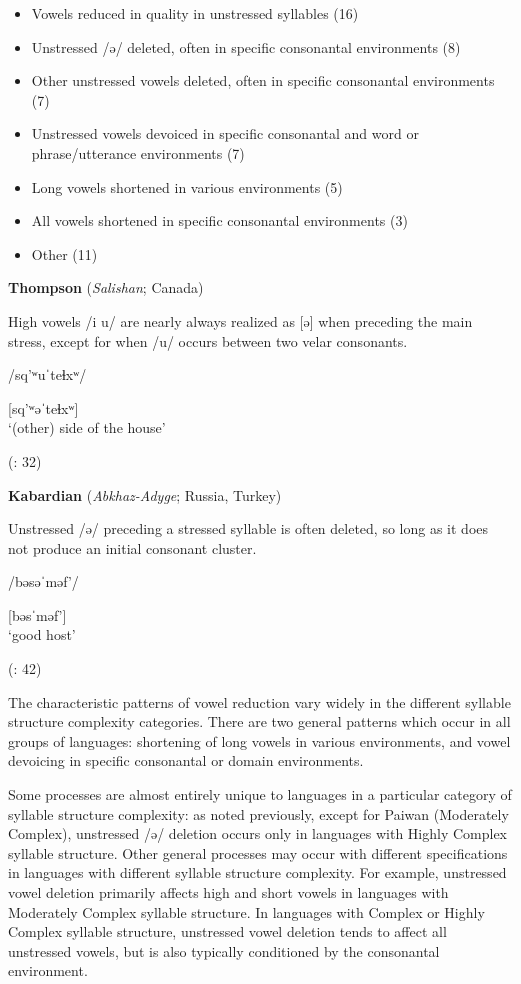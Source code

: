 \begin{itemize}
\item Vowels reduced in quality in unstressed syllables (16)
\item Unstressed /ə/ deleted, often in specific consonantal environments {(8)}
\item Other unstressed vowels deleted, often in specific consonantal environments (7)
\item Unstressed vowels devoiced in specific consonantal and word or phrase/utterance environments (7)
\item Long vowels shortened in various environments (5)
\item All vowels shortened in specific consonantal environments  {(3)}
\item Other (11)
\end{itemize}

\ea  \textbf{Thompson} (\textit{Salishan}; Canada)

High vowels /i u/ are nearly always realized as [ə] when preceding the main stress, except for when /u/ occurs between two velar consonants. 

/sq’ʷuˈteɬxʷ/

[sq’ʷəˈteɬxʷ]\\
\glt ‘(other) side of the house’

(\citealt{ThompsonThompson1992}: 32)

\ex  \textbf{Kabardian} (\textit{Abkhaz-Adyge}; Russia, Turkey) 

Unstressed /ə/ preceding a stressed syllable is often deleted, so long as it does not produce an initial consonant cluster.

/bəsəˈməf’/

[bəsˈməf’]\\
\glt ‘good host’

(\citealt{GordonApplebaum2010}: 42)
\z
\z

  The characteristic patterns of vowel reduction vary widely in the different syllable structure complexity categories. There are two general patterns which occur in all groups of languages: shortening of long vowels in various environments, and vowel devoicing in specific consonantal or domain environments. 

  Some processes are almost entirely unique to languages in a particular category of syllable structure complexity: as noted previously, except for Paiwan (Moderately Complex), unstressed /ə/ deletion occurs only in languages with Highly Complex syllable structure. Other general processes may occur with different specifications in languages with different syllable structure complexity. For example, unstressed vowel deletion primarily affects high and short vowels in languages with Moderately Complex syllable structure. In languages with Complex or Highly Complex syllable structure, unstressed vowel deletion tends to affect all unstressed vowels, but is also typically conditioned by the consonantal environment.

